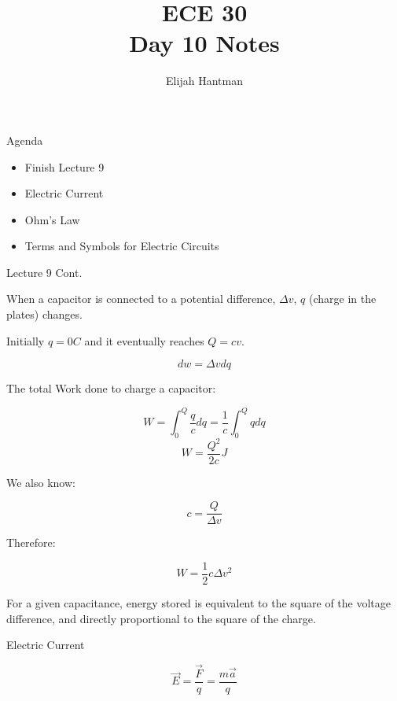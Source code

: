 \documentclass{report}
\title{\Huge{ECE 30}\\Day 10 Notes}
\author{\huge{Elijah Hantman}}
\date{}
\begin{document}
\maketitle
\newpage

\begin{description}
    \item {\large Agenda} 
        \begin{itemize}
            \item Finish Lecture 9
            \item Electric Current
            \item Ohm's Law
            \item Terms and Symbols for Electric Circuits
        \end{itemize}
    \item {\large Lecture 9 Cont.}
        \begin{mdframed}
           When a capacitor is connected to a potential
           difference, $\Delta v$, $q$ (charge in the plates)
           changes.

           Initially $q = 0\si{C}$ and it eventually reaches
           $Q = cv$.
           
           \begin{displaymath}
                dw = \Delta v dq
           \end{displaymath}

           The total Work done to charge a capacitor:

           \begin{displaymath}
                W = \int_0^Q \frac{q}{c} dq
                = \frac{1}{c} \int_0^Q q dq
           \end{displaymath}
           \begin{displaymath}
                W = \frac{Q^2}{2c} \si{J}
           \end{displaymath}

           We also know:

           \begin{displaymath}
                c = \frac{Q}{\Delta v}
           \end{displaymath}

           Therefore:

           \begin{displaymath}
                W = \frac{1}{2}c \Delta v^2
           \end{displaymath}
           
           
           For a given capacitance, energy stored is
           equivalent to the square of the voltage difference,
           and directly proportional to the square of the
           charge.
        \end{mdframed}
    \item {\large Electric Current}
        \begin{mdframed}
            \begin{displaymath}
                \vec{E} = \frac{\vec{F}}{q}
                = \frac{m\vec{a}}{q}
            \end{displaymath}
            

\end{mdframed}
\end{description}
\end{document}
